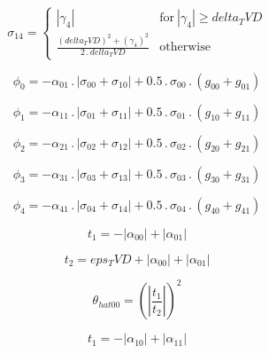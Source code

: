 \documentclass{article}
\begin{document}
\begin{dmath}\sigma_{1 4} = \begin{cases} \left|{\gamma_{4}}\right| & \text{for}\: \left|{\gamma_{4}}\right| \geq delta_TVD \\\frac{\left(delta_TVD \right)^{2} + \left(\gamma_{4} \right)^{2}}{2 \,.\, delta_TVD} & \text{otherwise} 
\end{cases}\end{dmath}

\begin{dmath}\phi_{0} = - \alpha_{01} \,.\, \left|{\sigma_{0 0} + \sigma_{1 0}}\right| + 0.5 \,.\, \sigma_{0 0} \,.\, \left(g_{00} + g_{01}\right)\end{dmath}

\begin{dmath}\phi_{1} = - \alpha_{11} \,.\, \left|{\sigma_{0 1} + \sigma_{1 1}}\right| + 0.5 \,.\, \sigma_{0 1} \,.\, \left(g_{10} + g_{11}\right)\end{dmath}

\begin{dmath}\phi_{2} = - \alpha_{21} \,.\, \left|{\sigma_{0 2} + \sigma_{1 2}}\right| + 0.5 \,.\, \sigma_{0 2} \,.\, \left(g_{20} + g_{21}\right)\end{dmath}

\begin{dmath}\phi_{3} = - \alpha_{31} \,.\, \left|{\sigma_{0 3} + \sigma_{1 3}}\right| + 0.5 \,.\, \sigma_{0 3} \,.\, \left(g_{30} + g_{31}\right)\end{dmath}

\begin{dmath}\phi_{4} = - \alpha_{41} \,.\, \left|{\sigma_{0 4} + \sigma_{1 4}}\right| + 0.5 \,.\, \sigma_{0 4} \,.\, \left(g_{40} + g_{41}\right)\end{dmath}

\begin{dmath}t_{1} = - \left|{\alpha_{00}}\right| + \left|{\alpha_{01}}\right|\end{dmath}

\begin{dmath}t_{2} = eps_TVD + \left|{\alpha_{00}}\right| + \left|{\alpha_{01}}\right|\end{dmath}

\begin{dmath}\theta_{hat 00} = \left(\left|{\frac{t_{1}}{t_{2}}}\right| \right)^{2}\end{dmath}

\begin{dmath}t_{1} = - \left|{\alpha_{10}}\right| + \left|{\alpha_{11}}\right|\end{dmath}
\end{document}
